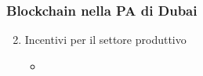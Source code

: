 \begin{frame}
 \frametitle{Blockchain nella PA di Dubai}

 \begin{enumerate}
 \setcounter{enumi}{1}
  \item Incentivi per il settore produttivo
  \begin{itemize}
   \item
  \end{itemize}

 \end{enumerate}

\end{frame}
